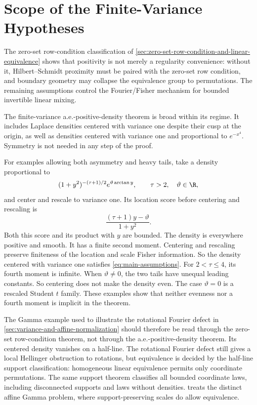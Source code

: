 \section{Scope of the Finite-Variance Hypotheses}
\label{sec:scope-of-the-finite-variance-hypotheses}

The zero-set row-condition classification of
\cref{sec:zero-set-row-condition-and-linear-equivalence} shows that
positivity is not merely a regularity convenience: without it,
Hilbert--Schmidt proximity must be paired with the zero-set row condition,
and boundary geometry may collapse the equivalence group to permutations.
The remaining assumptions control the Fourier/Fisher mechanism for bounded
invertible linear mixing.

The finite-variance a.e.-positive-density theorem is broad within its regime.
It includes Laplace densities centered with variance one despite their
cusp at the origin, as well as densities centered with variance one and proportional to
\(e^{-x^4}\).
Symmetry is not needed in any step of the proof.

For examples allowing both asymmetry and heavy tails, take a density
proportional to
\begin{equation}
 (1+y^2)^{-(\tau+1)/2}
                           e^{\vartheta\arctan y},
 \qquad \tau>2,\quad \vartheta\in\R,
 \label{eq:asymmetric-heavy-tail-example}
\end{equation}
and center and rescale to variance one.
Its location score before centering and rescaling is
\[
 \frac{(\tau+1)y-\vartheta}{1+y^2}.
\]
Both this score and its product with \(y\) are bounded.
The density is everywhere positive and smooth.
It has a finite second moment.
Centering and rescaling preserve finiteness of the location and scale
Fisher information.
So the density centered with variance one satisfies \eqref{eq:main-assumptions}.
For \(2<\tau\le4\), its fourth moment is infinite.
When \(\vartheta\ne0\), the two tails have unequal leading constants.
So centering does not make the density even.
The case \(\vartheta=0\) is a rescaled Student \(t\) family.
These examples show that neither evenness nor a fourth moment is implicit in
the theorem.

The Gamma example used to illustrate the rotational Fourier defect in
\cref{sec:variance-and-affine-normalization} should therefore be read
through the zero-set row-condition theorem, not through the
a.e.-positive-density theorem.
Its centered density vanishes on a half-line.
The rotational Fourier defect still gives a local Hellinger obstruction to rotations,
but equivalence is decided by the half-line support classification:
homogeneous linear equivalence permits only coordinate permutations.
The same support theorem classifies all bounded coordinate laws, including
disconnected supports and laws without densities.
 treats the distinct affine Gamma problem,
where support-preserving scales do allow equivalence.

